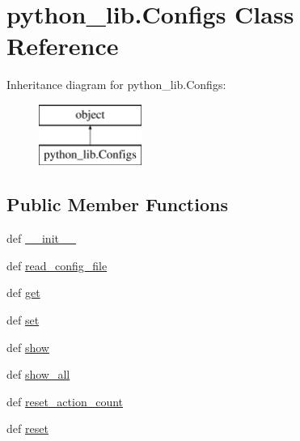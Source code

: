 \hypertarget{classpython__lib_1_1_configs}{\section{python\-\_\-lib.\-Configs Class Reference}
\label{classpython__lib_1_1_configs}
}
Inheritance diagram for python\-\_\-lib.\-Configs\-:\begin{figure}[H]
\begin{center}
\leavevmode
\includegraphics[height=2.000000cm]{classpython__lib_1_1_configs}
\end{center}
\end{figure}
\subsection*{Public Member Functions}
\begin{DoxyCompactItemize}
\item 
def \hyperlink{classpython__lib_1_1_configs_ab8338856ed3d266b0261606b75604612}{\-\_\-\-\_\-init\-\_\-\-\_\-}
\item 
def \hyperlink{classpython__lib_1_1_configs_acf2aa63cdb4635793ed21501743aacc1}{read\-\_\-config\-\_\-file}
\item 
def \hyperlink{classpython__lib_1_1_configs_a0afc89d68ccdd876e456ed21c0be25dc}{get}
\item 
def \hyperlink{classpython__lib_1_1_configs_a6488b0b6ce3fde518900de6d47b83f4f}{set}
\item 
def \hyperlink{classpython__lib_1_1_configs_a33404ffe7e17777f68576a126b0e5eb5}{show}
\item 
def \hyperlink{classpython__lib_1_1_configs_ad512301d0952867503d8d2ec8022c994}{show\-\_\-all}
\item 
def \hyperlink{classpython__lib_1_1_configs_a203b904533408187d81fe213aeb3545f}{reset\-\_\-action\-\_\-count}
\item 
def \hyperlink{classpython__lib_1_1_configs_a6061f898beac2fa1e700e36d76eef2f8}{reset}
\end{DoxyCompactItemize}


